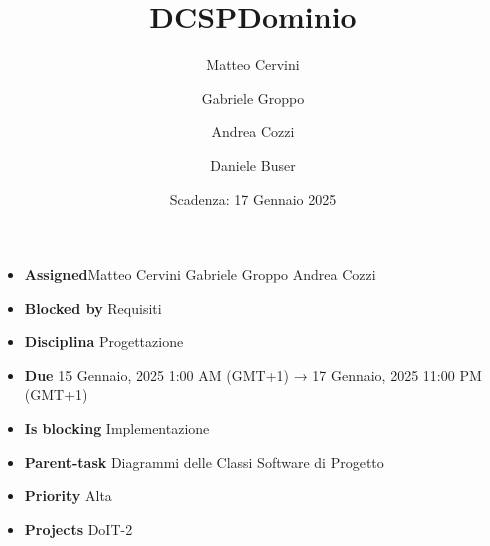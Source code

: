 \title{DCSPDominio}
\author{Matteo Cervini \and Gabriele Groppo \and Andrea Cozzi \and Daniele Buser}
\date{Scadenza: 17 Gennaio 2025}

\maketitle

\begin{itemize}
    \item \textbf{Assigned}Matteo Cervini Gabriele Groppo Andrea Cozzi
    \item \textbf{Blocked by} Requisiti
    \item \textbf{Disciplina} Progettazione
    \item \textbf{Due} 15 Gennaio, 2025 1:00 AM (GMT+1) → 17 Gennaio, 2025 11:00 PM (GMT+1)
    \item \textbf{Is blocking} Implementazione
    \item \textbf{Parent-task} Diagrammi delle Classi Software di Progetto
    \item \textbf{Priority} Alta
    \item \textbf{Projects} DoIT-2
\end{itemize}